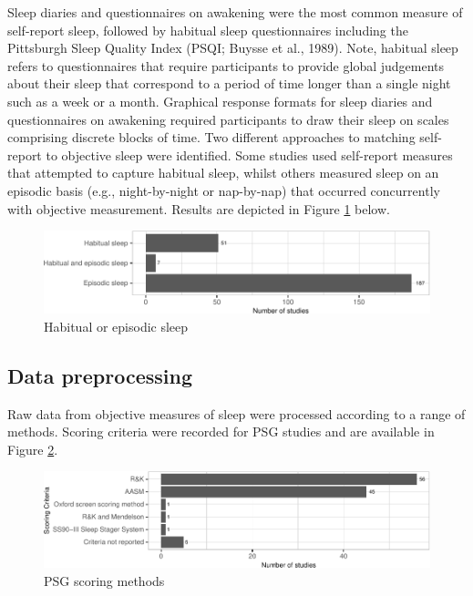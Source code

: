 \documentclass[
]{article}
\begin{document}
Sleep diaries and questionnaires on awakening were the most common measure of self-report sleep, followed by habitual sleep questionnaires including the Pittsburgh Sleep Quality Index (PSQI; Buysse et al., 1989). Note, habitual sleep refers to questionnaires that require participants to provide global judgements about their sleep that correspond to a period of time longer than a single night such as a week or a month. Graphical response formats for sleep diaries and questionnaires on awakening required participants to draw their sleep on scales comprising discrete blocks of time. Two different approaches to matching self-report to objective sleep were identified. Some studies used self-report measures that attempted to capture habitual sleep, whilst others measured sleep on an episodic basis (e.g., night-by-night or nap-by-nap) that occurred concurrently with objective measurement. Results are depicted in Figure \ref{fig:habitual} below.

\begin{figure}
\centering
\includegraphics{review_markdown_files/figure-latex/habitual-1.pdf}
\caption{\label{fig:habitual}Habitual or episodic sleep}
\end{figure}

\subsection{Data preprocessing}\label{data-preprocessing}

Raw data from objective measures of sleep were processed according to a range of methods. Scoring criteria were recorded for PSG studies and are available in Figure \ref{fig:scoring}.

\begin{figure}
\centering
\includegraphics{review_markdown_files/figure-latex/scoring-1.pdf}
\caption{\label{fig:scoring}PSG scoring methods}
\end{figure}
\end{document}
